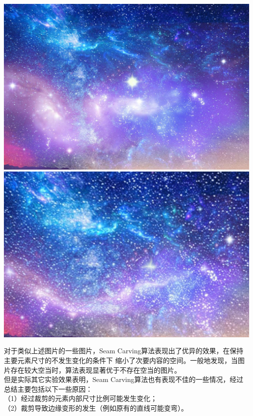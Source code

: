 \documentclass[a4paper]{article}
\begin{document}
\begin{enumerate}
  \begin{center}
    \includegraphics[scale=0.075]{Pictures/example2.jpg}
    \includegraphics[scale=0.15]{Pictures/er2n.jpg}
  \end{center}
  
  对于类似上述图片的一些图片，Seam Carving算法表现出了优异的效果，在保持主要元素尺寸的不发生变化的条件下
  缩小了次要内容的空间。一般地发现，当图片存在较大空当时，算法表现显著优于不存在空当的图片。\\
  但是实际其它实验效果表明，Seam Carving算法也有表现不佳的一些情况，经过总结主要包括以下一些原因：\\
  （1）经过裁剪的元素内部尺寸比例可能发生变化；\\
  （2）裁剪导致边缘变形的发生（例如原有的直线可能变弯）。
\end{enumerate}
\end{document}
